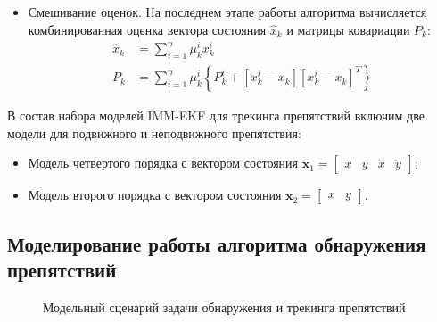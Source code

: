 \documentclass[14pt]{article}
\begin{document}
\begin{itemize}
\item Смешивание оценок.
На последнем этапе работы алгоритма вычисляется комбинированная оценка вектора состояния $\hat{x}_k$  и матрицы ковариации $P_k$:
\begin{align}
	\hat{x}_k &= \sum_{i=1}^n \mu_k^i x_k^i \\
	P_k &= \sum_{i=1}^n \mu_k^i \left\{P_{k}^i+\left[x_{k}^i-x_{k}\right]\left[x_{k}^i-x_{k}\right]^T\right\}
\end{align}
\end{itemize}

В состав набора моделей IMM-EKF для трекинга препятствий включим две модели для подвижного и неподвижного препятствия:
\begin{itemize}
\item Модель четвертого порядка с вектором состояния $\boldsymbol x_1 = \begin{bmatrix} x& y & \dot x & \dot y\end{bmatrix}$;
\item Модель второго порядка с вектором состояния $\boldsymbol x_2 = \begin{bmatrix} x & y\end{bmatrix}$.
\end{itemize}

\subsection{Моделирование работы алгоритма обнаружения препятствий}

\begin{figure}
\noindent{}
\caption{Модельный сценарий задачи обнаружения и трекинга препятствий}
\label{fig:setup_tracker}
\end{figure}
\end{document}
